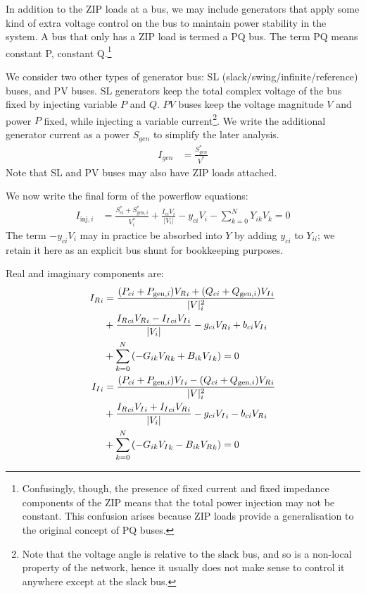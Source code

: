 \documentclass[10pt]{article}
\newcommand{\Vr}{{V_R}}
\newcommand{\Vi}{{V_I}}
\newcommand{\Ir}{{I_R}}
\newcommand{\Ii}{{I_I}}
\begin{document}
In addition to the ZIP loads at a bus, we may include generators that apply some kind of extra voltage control on the bus to maintain power stability in the system. A bus that only has a ZIP load is termed a PQ bus. The term PQ means constant P, constant Q.\footnote{Confusingly, though, the presence of fixed current and fixed impedance components of the ZIP means that the total power injection may not be constant. This confusion arises because ZIP loads provide a generalisation to the original concept of PQ buses.}

We consider two other types of generator bus: SL (slack/swing/infinite/reference) buses, and PV buses. SL generators keep the total complex voltage of the bus fixed by injecting variable $P$ and $Q$. $PV$ buses keep the voltage magnitude $V$ and power $P$ fixed, while injecting a variable current\footnote{Note that the voltage angle is relative to the slack bus, and so is a non-local property of the network, hence it usually does not make sense to control it anywhere except at the slack bus.}. We write the additional generator current as a power $S_{gen}$ to simplify the later analysis.
\begin{align}
I_{gen} &= \frac{S_{gen}^*}{V^*}
\end{align}
Note that SL and PV buses may also have ZIP loads attached.

We now write the final form of the powerflow equations:
\begin{align}
I_{\text{inj},i} &= \frac{S^*_{ci} + S^*_{\text{gen},i}}{V^*_i} + \frac{I_{ci}V_i}{|V_i|} - y_{ci}V_i - \sum_{k=0}^NY_{ik}V_k = 0
\label{EQ_POWERFLOW_COMPLEX}
\end{align}
The term $-y_{ci}V_i$ may in practice be absorbed into $Y$ by adding $y_{ci}$ to $Y_{ii}$; we retain it here as an explicit bus shunt for bookkeeping purposes.

Real and imaginary components are:
\begin{align}
	\Ir_i &= \frac{(P_{ci} + P_{\text{gen},i})\Vr_i + (Q_{ci} + Q_{\text{gen},i})\Vi_i}{|V|^2_i} \notag \\
	      &+ \frac{\Ir_{ci}\Vr_{i} - \Ii_{ci}\Vi_i}{|V_i|} -g_{ci}\Vr_i + b_{ci}\Vi_i \notag \\
	      &+ \sum_{k=0}^N\left(-G_{ik}\Vr_k + B_{ik}\Vi_k\right) = 0\\
	\Ii_i &= \frac{(P_{ci} + P_{\text{gen},i})\Vi_i - (Q_{ci} + Q_{\text{gen},i})\Vr_i}{|V|^2_i} \notag \\
	      &+ \frac{\Ir_{ci}\Vi_{i} + \Ii_{ci}\Vr_{i}}{|V_i|} -g_{ci}\Vi_i - b_{ci}\Vr_i \notag \\
	&+ \sum_{k=0}^N\left(-G_{ik}\Vi_k - B_{ik}\Vr_k\right) = 0
\end{align}
\end{document}
